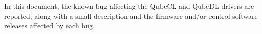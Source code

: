 \documentclass[a4paper,12pt,english]{article}
\begin{document}
	
	\newpage

In this document, the known bug affecting the QubeCL and QubeDL drivers are reported, along with a small description and the firmware and/or control software releases affected by each bug.

    \tableofcontents
	\newpage

    
	
    \newpage

    \begin{versionhistory}
    \end{versionhistory}
\end{document}
